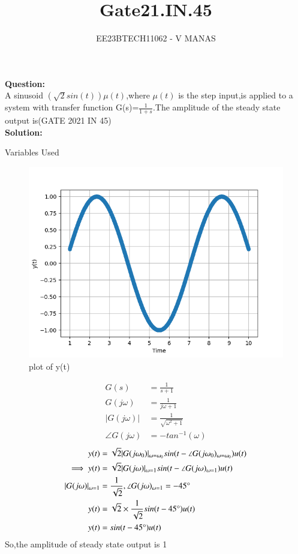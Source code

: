 \documentclass[journal,12pt,twocolumn]{IEEEtran}
\theoremstyle{remark}
\begin{document}

\vspace{3cm}

\title{Gate21.IN.45}
\author{EE23BTECH11062 - V MANAS}
\maketitle
\newpage

\bigskip
\textbf{Question:}\\A sinusoid $(\sqrt{2}sin(t))\mu(t)$,where $\mu(t)$ is the step input,is applied to a system with transfer function G(s)=$\frac{1}{1+s}$.The amplitude of the steady state output is\hfill{(GATE 2021 IN 45)}\\
\textbf{Solution:}
\begin{table}[h]
    \centering
    
    \caption{Variables Used}
    \label{tab:gate21.in.45}
\end{table}
\begin{figure}[h]
    \centering
    \includegraphics[width=1.0\linewidth]{figs/graph.png}
    \caption{plot of y(t)}
\end{figure}
\begin{align}
    G(s)&=\frac{1}{s+1}\\
    G(j\omega)&=\frac{1}{j\omega+1}\\
    |G(j\omega)|&=\frac{1}{\sqrt{\omega^2+1}}\\
    \angle G(j\omega)&=-tan^{-1}(\omega)
\end{align}
\begin{align}
    y(t)&=\sqrt{2}|G(j\omega_0)|_{\omega=\omega_0}sin(t-\angle G(j\omega_0)_{\omega=\omega_0})u(t)\\    
    \implies y(t)&=\sqrt{2}|G(j\omega)|_{\omega=1}sin(t-\angle G(j\omega)_{\omega=1})u(t)\\
    |G(j\omega)|_{\omega=1}&=\frac{1}{\sqrt{2}},\angle G(j\omega)_{\omega=1}=-45\degree\\
    y(t)&=\sqrt{2}\times\frac{1}{\sqrt{2}}sin(t-45\degree)u(t)\\
    y(t)&=sin(t-45\degree)u(t)
\end{align}
So,the amplitude of steady state output is 1
\end{document}
